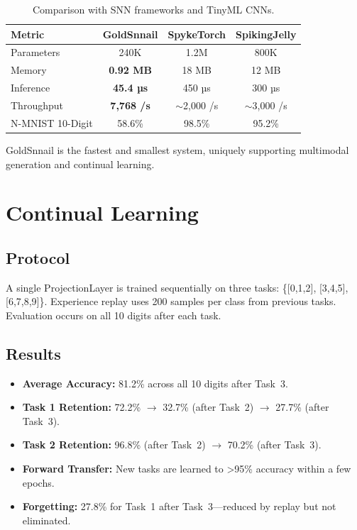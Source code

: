 \documentclass[conference]{IEEEtran}
\begin{document}
\begin{table}[h]
\centering
\caption{Comparison with SNN frameworks and TinyML CNNs.}
\label{tab:efficiency}
\begin{tabular}{lccc}
\toprule
\textbf{Metric} & \textbf{GoldSnnail} & \textbf{SpykeTorch} & \textbf{SpikingJelly} \\
\midrule
Parameters & 240K & 1.2M & 800K \\
Memory & \textbf{0.92 MB} & 18 MB & 12 MB \\
Inference & \textbf{45.4 µs} & 450 µs & 300 µs \\
Throughput & \textbf{7,768 /s} & $\sim$2,000 /s & $\sim$3,000 /s \\
N-MNIST 10-Digit & 58.6\% & 98.5\% & 95.2\% \\
\bottomrule
\end{tabular}
\end{table}

GoldSnnail is the fastest and smallest system, uniquely supporting multimodal generation and continual learning.

\section{Continual Learning}

\subsection{Protocol}
A single ProjectionLayer is trained sequentially on three tasks: \{[0,1,2], [3,4,5], [6,7,8,9]\}. Experience replay uses 200 samples per class from previous tasks. Evaluation occurs on all 10 digits after each task.

\subsection{Results}
\begin{itemize}
    \item \textbf{Average Accuracy:} 81.2\% across all 10 digits after Task~3.
    \item \textbf{Task 1 Retention:} 72.2\% $\rightarrow$ 32.7\% (after Task~2) $\rightarrow$ 27.7\% (after Task~3).
    \item \textbf{Task 2 Retention:} 96.8\% (after Task~2) $\rightarrow$ 70.2\% (after Task~3).
    \item \textbf{Forward Transfer:} New tasks are learned to >95\% accuracy within a few epochs.
    \item \textbf{Forgetting:} 27.8\% for Task~1 after Task~3---reduced by replay but not eliminated.
\end{itemize}
\end{document}
